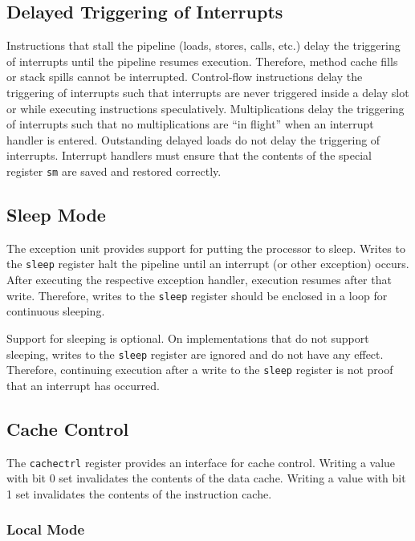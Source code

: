 \documentclass[a4paper,fontsize=10pt,twoside,DIV15,BCOR12mm,headinclude=true,footinclude=false,pagesize,bibtotoc]{scrbook}
\begin{document}
\subsection{Delayed Triggering of Interrupts}

Instructions that stall the pipeline (loads, stores, calls, etc.)
delay the triggering of interrupts until the pipeline resumes
execution. Therefore, method cache fills or stack spills cannot be
interrupted. Control-flow instructions delay the triggering of
interrupts such that interrupts are never triggered inside a delay
slot or while executing instructions speculatively. Multiplications
delay the triggering of interrupts such that no multiplications are
``in flight'' when an interrupt handler is entered. Outstanding
delayed loads do not delay the triggering of interrupts. Interrupt
handlers must ensure that the contents of the special register
\texttt{sm} are saved and restored correctly.

\subsection{Sleep Mode}

The exception unit provides support for putting the processor to
sleep. Writes to the \texttt{sleep} register halt the pipeline until
an interrupt (or other exception) occurs. After executing the
respective exception handler, execution resumes after that
write. Therefore, writes to the \texttt{sleep} register should be
enclosed in a loop for continuous sleeping.

Support for sleeping is optional. On implementations that do not
support sleeping, writes to the \texttt{sleep} register are ignored
and do not have any effect. Therefore, continuing execution after a
write to the \texttt{sleep} register is not proof that an interrupt
has occurred.

\subsection{Cache Control}
\label{sec:cachectrl}

The \texttt{cachectrl} register provides an interface for cache
control. Writing a value with bit 0 set invalidates the contents of
the data cache. Writing a value with bit 1 set invalidates the
contents of the instruction cache.

\subsubsection{Local Mode}
\end{document}
